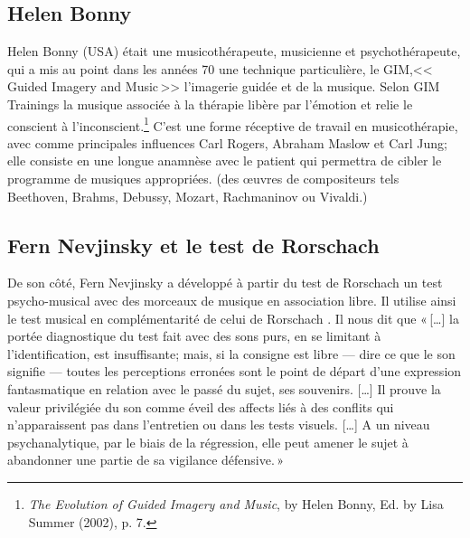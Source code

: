 \subsection{Helen Bonny} 


Helen Bonny (USA) était une musicothérapeute,
musicienne et psychothérapeute, qui a mis au point dans les années 70
une technique particulière, le GIM,<<\,Guided Imagery and Music\,>>
l'imagerie guidée et de la musique. Selon GIM
Trainings\autocite{gim_site} la
musique associée à la thérapie libère par l'émotion et relie le
conscient à l'inconscient.\footnote{\textsl{The Evolution of Guided Imagery and Music}, 
	by Helen Bonny, Ed. by Lisa Summer (2002), p. 7.}
 C'est une forme réceptive de travail
en musicothérapie, avec comme principales influences Carl Rogers, Abraham Maslow et Carl Jung; 
elle  consiste en une longue anamnèse avec le
patient qui permettra de cibler le programme de musiques appropriées. 
(des \oe uvres de compositeurs tels Beethoven, Brahms, Debussy,
Mozart, Rachmaninov ou Vivaldi.)






 \subsection{Fern Nevjinsky et le test de Rorschach}
 
 De son côté, Fern Nevjinsky a développé à partir du  test de Rorschach un test psycho-musical avec des morceaux
de musique en association libre. Il utilise ainsi le test
musical en complémentarité de celui de Rorschach%
\autocite[Fern Nevjinsky, maître de conférences à l'Université de Rouen, musicien, psycho-analyste. 
Comparaison des modalités de projection et d'expression au test de Rorschach et à un test psycho-musical pour des adolescents de 13 à 16 ans.]{nevjinsky:adolescence}.  
Il nous dit  que  «\,[\ldots] la
portée diagnostique du test fait avec des sons purs, en se limitant à
l'identification, est insuffisante; mais, si la consigne est libre ---
dire ce que le son signifie --- toutes les perceptions erronées sont
le point de départ d'une expression fantasmatique en relation avec le
passé du sujet, ses souvenirs. [\ldots] 
Il prouve  la valeur privilégiée du son comme éveil
des affects liés à des conflits qui n'apparaissent pas dans
l'entretien ou dans les tests visuels.  [\ldots] A un niveau
psychanalytique, par le biais de la régression, elle peut amener le sujet à abandonner une partie de sa vigilance défensive.\,»

